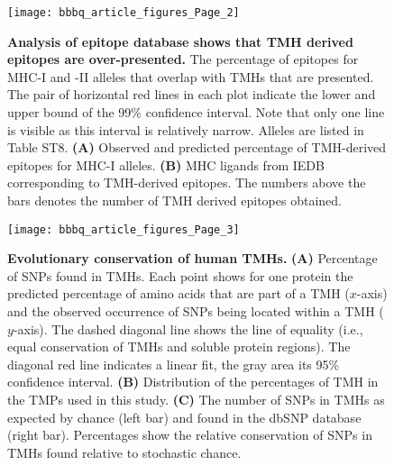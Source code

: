 \documentclass[utf8]{frontiersSCNS} %
\begin{document}
%
%
\begin{figure}[h!]
\begin{center}
\texttt{[image: bbbq\_article\_figures\_Page\_2]}%
\end{center}
\caption{
    \textbf{
      Analysis of epitope database shows that TMH derived epitopes are over-presented.
    }
    The percentage of epitopes for MHC-I and -II alleles that overlap with TMHs
    that are presented. The pair of horizontal red lines in each plot indicate the
    lower and upper bound of the 99\% confidence interval. Note that only one line
    is visible as this interval is relatively narrow. 
    Alleles are listed in Table ST8.
    \textbf{(A)} 
    Observed and predicted percentage of TMH-derived epitopes for MHC-I alleles. 
    \textbf{(B)} 
    MHC ligands from IEDB corresponding to TMH-derived epitopes. 
    The numbers above the bars denotes the number of TMH derived epitopes obtained.
}
\label{fig:2}
\end{figure}



%
%
\begin{figure}[h!]
\begin{center}
\texttt{[image: bbbq\_article\_figures\_Page\_3]}%
\end{center}
\caption{
    \textbf{Evolutionary conservation of human TMHs.}
    \textbf{(A)} 
    Percentage of SNPs found in TMHs.
    Each point shows for one protein the predicted percentage of
    amino acids that are part of a TMH ($x$-axis) and the observed occurrence of SNPs being located
    within a TMH ($y$-axis).
    The dashed diagonal line shows the line of equality (i.e.,
    equal conservation of TMHs and soluble protein regions). 
    The diagonal red line indicates a linear fit, 
    the gray area its 95\% confidence interval.
    \textbf{(B)}
    Distribution of the percentages of TMH in the TMPs used in this study.
    \textbf{(C)}
    The number of SNPs in TMHs as expected by chance (left bar) 
    and found in the dbSNP database (right bar).
    Percentages show the relative conservation
    of SNPs in TMHs found relative to stochastic chance.
}
\label{fig:3}
\end{figure}
\end{document}
